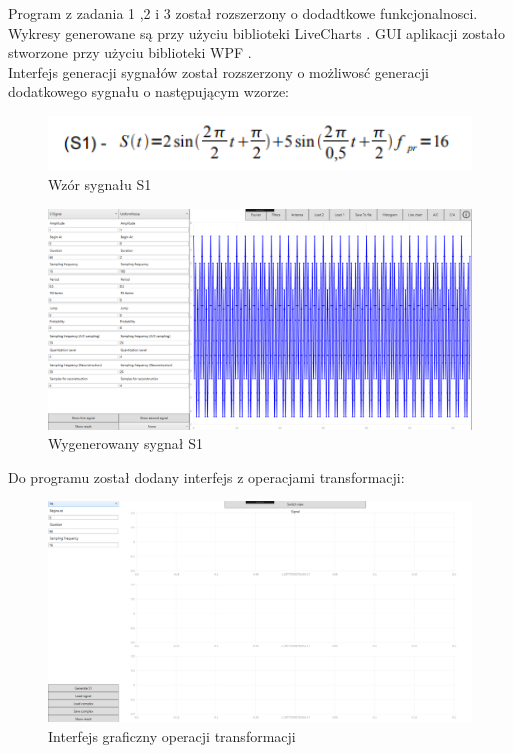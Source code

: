 \documentclass[12pt]{article}
\begin{document}
Program z zadania 1 ,2  i 3 został rozszerzony o dodadtkowe funkcjonalnosci. Wykresy generowane są przy użyciu biblioteki LiveCharts \cite{lv}. GUI aplikacji zostało stworzone przy użyciu biblioteki WPF \cite{wpf}.
\\Interfejs generacji sygnałów został rozszerzony o możliwosć generacji dodatkowego sygnału o następującym wzorze:
\begin{figure}[H]
 \centering
 \includegraphics[width=15cm]{images/signal.PNG}
 \vspace{-0.3cm}
 \caption{Wzór sygnału S1}
 \label{gui}
\end{figure}
\begin{figure}[H]
 \centering
 \includegraphics[width=15cm]{images/newsignal.PNG}
 \vspace{-0.3cm}
 \caption{Wygenerowany sygnał S1}
 \label{gui}
\end{figure}
Do programu został dodany interfejs z operacjami transformacji:
\begin{figure}[H]
 \centering
 \includegraphics[width=15cm]{images/fourierWindow.PNG}
 \vspace{-0.3cm}
 \caption{Interfejs graficzny operacji transformacji}
 \label{gui}
\end{figure}
\end{document}
